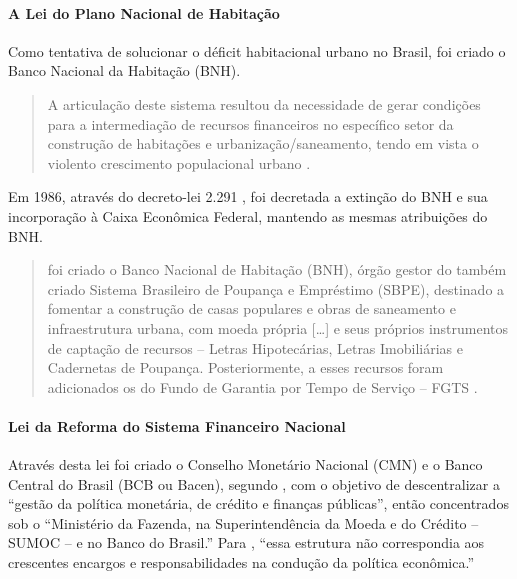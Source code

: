 \documentclass[]{article}
\let\oldparagraph\paragraph
\renewcommand{\paragraph}[1]{\oldparagraph{#1}\mbox{}}
\begin{document}
\paragraph{A Lei do Plano Nacional de
Habitação}\label{a-lei-do-plano-nacional-de-habitacao}

Como tentativa de solucionar o déficit habitacional urbano no Brasil,
foi criado o Banco Nacional da Habitação (BNH).

\begin{quote}
A articulação deste sistema resultou da necessidade de gerar condições
para a intermediação de recursos financeiros no específico setor da
construção de habitações e urbanização/saneamento, tendo em vista o
violento crescimento populacional urbano \cite[p.~44]{fortuna2015}.
\end{quote}

Em 1986, através do decreto-lei 2.291 \cite{brasil1986}, foi decretada a
extinção do BNH e sua incorporação à Caixa Econômica Federal, mantendo
as mesmas atribuições do BNH.

\begin{quote}
foi criado o Banco Nacional de Habitação (BNH), órgão gestor do também
criado Sistema Brasileiro de Poupança e Empréstimo (SBPE), destinado a
fomentar a construção de casas populares e obras de saneamento e
infraestrutura urbana, com moeda própria {[}\ldots{}{]} e seus próprios
instrumentos de captação de recursos -- Letras Hipotecárias, Letras
Imobiliárias e Cadernetas de Poupança. Posteriormente, a esses recursos
foram adicionados os do Fundo de Garantia por Tempo de Serviço -- FGTS
\cite[p.~15]{fortuna2015}.
\end{quote}

\paragraph{Lei da Reforma do Sistema Financeiro
Nacional}\label{lei-da-reforma-do-sistema-financeiro-nacional}

Através desta lei foi criado o Conselho Monetário Nacional (CMN) e o
Banco Central do Brasil (BCB ou Bacen), segundo
, com o objetivo de descentralizar a
``gestão da política monetária, de crédito e finanças públicas'', então
concentrados sob o ``Ministério da Fazenda, na Superintendência da Moeda
e do Crédito -- SUMOC -- e no Banco do Brasil.'' Para
, ``essa estrutura não correspondia aos
crescentes encargos e responsabilidades na condução da política
econômica.''
\end{document}
